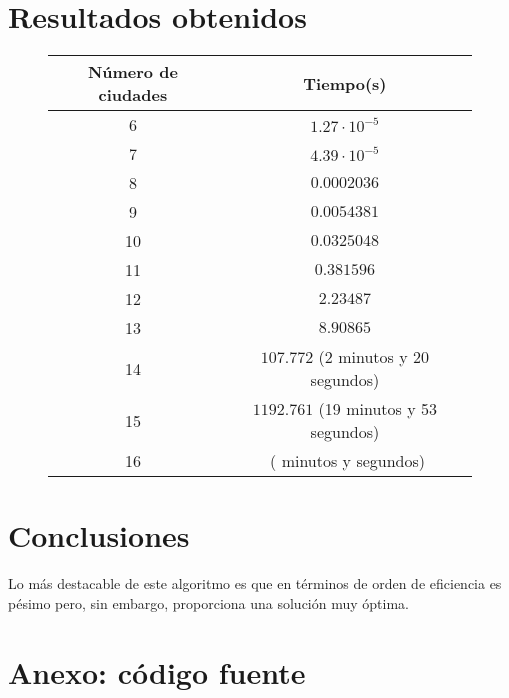 \documentclass[12pt,spanish]{article}
\begin{document}
\section{Resultados obtenidos}

\begin{figure}[H]
\centering
\begin{tabular}{|c|c|}
\hline
\textbf{Número de ciudades} & \textbf{Tiempo(s)}\\
\hline
6 & $1.27 \cdot 10^{-5}$\\
\hline
7 & $4.39 \cdot 10^{-5}$\\
\hline
8 & $0.0002036$\\
\hline
9 & $0.0054381$\\
\hline
10 & $0.0325048$\\
\hline
11 & $0.381596$\\
\hline
12 & $2.23487$\\
\hline
13 & $8.90865$\\
\hline
14 & $107.772$ (2 minutos y 20 segundos)\\
\hline
15 & $1192.761$ (19 minutos y 53 segundos)\\
\hline
16 & $ $ ( minutos y segundos)\\
\hline


\end{tabular}

\end{figure}

\section{Conclusiones}

Lo más destacable de este algoritmo es que en términos de orden de eficiencia es pésimo pero, sin embargo, proporciona una solución muy óptima.

\section{Anexo: código fuente}




\end{document}
